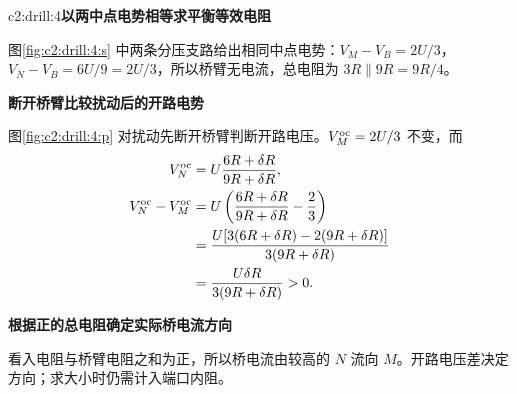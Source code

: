 \begin{drillsolution}{c2:drill:4}\textbf{以两中点电势相等求平衡等效电阻}\par\nobreak
图\ref{fig:c2:drill:4:s} 中两条分压支路给出相同中点电势：$V_M-V_B=2U/3$，$V_N-V_B=6U/9=2U/3$，所以桥臂无电流，总电阻为 $3R\parallel9R=9R/4$。



\par\medskip{}\noindent\textbf{断开桥臂比较扰动后的开路电势}\par\nobreak
图\ref{fig:c2:drill:4:p} 对扰动先断开桥臂判断开路电压。$V_M^{\rm oc}=2U/3$ 不变，而
\[
 \begin{aligned}
 V_N^{\rm oc}&=U\frac{6R+\delta R}{9R+\delta R},\\
 V_N^{\rm oc}-V_M^{\rm oc}
 &=U\left(\frac{6R+\delta R}{9R+\delta R}-\frac23\right)\\
 &=\frac{U[3(6R+\delta R)-2(9R+\delta R)]}{3(9R+\delta R)}\\
 &=\frac{U\delta R}{3(9R+\delta R)}>0.
 \end{aligned}
\]


\par\medskip{}\noindent\textbf{根据正的总电阻确定实际桥电流方向}\par\nobreak
看入电阻与桥臂电阻之和为正，所以桥电流由较高的 $N$ 流向 $M$。开路电压差决定方向；求大小时仍需计入端口内阻。\end{drillsolution}
